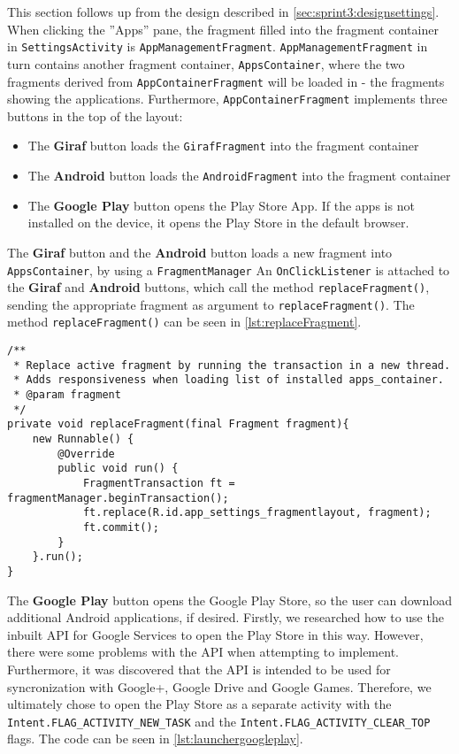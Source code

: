 This section follows up from the design described in \cref{sec:sprint3:designsettings}.
When clicking the ''Apps'' pane, the fragment filled into the fragment container in \lstinline!SettingsActivity! is \lstinline!AppManagementFragment!.
\lstinline!AppManagementFragment! in turn contains another fragment container, \lstinline!AppsContainer!, where the two fragments derived from \lstinline!AppContainerFragment! will be loaded in - the fragments showing the applications.
Furthermore, \lstinline!AppContainerFragment! implements three buttons in the top of the layout:

\begin{itemize}
\item The \textbf{Giraf} button loads the \lstinline!GirafFragment! into the fragment container
\item The \textbf{Android} button loads the \lstinline!AndroidFragment! into the fragment container
\item The \textbf{Google Play} button opens the Play Store App. If the apps is not installed on the device, it opens the Play Store in the default browser.
\end{itemize}

The \textbf{Giraf} button and the \textbf{Android} button loads a new fragment into \lstinline!AppsContainer!, by using a \lstinline!FragmentManager!
An  \lstinline!OnClickListener! is attached to the \textbf{Giraf} and \textbf{Android} buttons, which call the method \lstinline!replaceFragment()!, sending the appropriate fragment as argument to \lstinline!replaceFragment()!.
The method \lstinline!replaceFragment()! can be seen in \cref{lst:replaceFragment}.

\begin{lstlisting}[caption={Method used to replace the fragment currently loaded into the fragment container in AppManagementFragment}, label={lst:replaceFragment}]
/**
 * Replace active fragment by running the transaction in a new thread.
 * Adds responsiveness when loading list of installed apps_container.
 * @param fragment
 */
private void replaceFragment(final Fragment fragment){
    new Runnable() {
        @Override
        public void run() {
            FragmentTransaction ft = fragmentManager.beginTransaction();
            ft.replace(R.id.app_settings_fragmentlayout, fragment);
            ft.commit();
        }
    }.run();
}
\end{lstlisting}

The \textbf{Google Play} button opens the Google Play Store, so the user can download additional Android applications, if desired. 
Firstly, we researched how to use the inbuilt API for Google Services  to open the Play Store in this way.
However, there were some problems with the API when attempting to implement.
Furthermore, it was discovered that the API is intended to be used for syncronization with Google+, Google Drive and Google Games.
Therefore, we ultimately chose to open the Play Store as a separate activity with the \lstinline!Intent.FLAG_ACTIVITY_NEW_TASK! and the \lstinline!Intent.FLAG_ACTIVITY_CLEAR_TOP! flags.
The code can be seen in \cref{lst:launchergoogleplay}.


